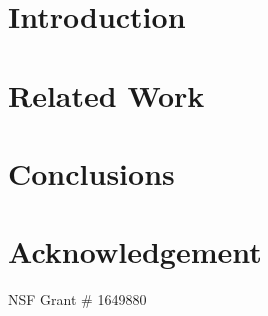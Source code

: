 \documentclass[sigplan,10pt]{acmart}\settopmatter{printfolios=true,printccs=false,printacmref=false}
\begin{document}


\maketitle

\section{Introduction}


\vspace{-10pt}
\section{Related Work}






\section{Conclusions}


\section{Acknowledgement}
NSF Grant \# 1649880

{\footnotesize 
}


%
\end{document}
